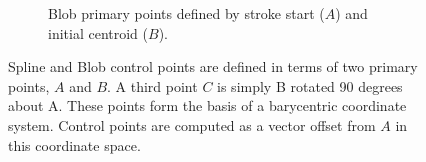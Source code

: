 \begin{figure}
\begin{subfigure}[t]{0.42\textwidth}
    \caption{Blob primary points defined by stroke start ($A$) and
      initial centroid ($B$).}
    \label{fig:barycentric-blob}
  \end{subfigure}
  \caption[Spline and Blob Control Points]{Spline and Blob control
    points are defined in terms of two primary points, $A$ and $B$. A
    third point $C$ is simply B rotated 90 degrees about A. These
    points form the basis of a barycentric coordinate system. Control
    points are computed as a vector offset from $A$ in this coordinate
    space.}
  \label{fig:spline-blob-control-points}
\end{figure}


